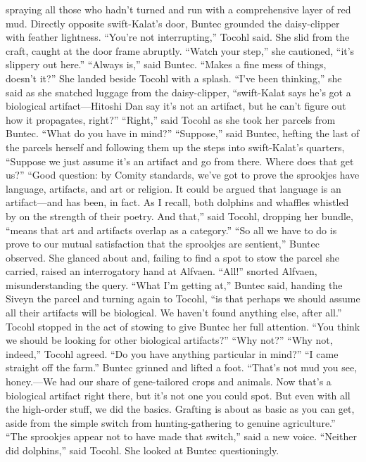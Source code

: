 \documentclass[9pt]{article}
\begin{document}
spraying all those who hadn’t turned and run with a comprehensive layer of red mud. Directly opposite
swift-Kalat’s door, Buntec grounded the daisy-clipper with feather lightness.
“You’re not interrupting,” Tocohl said. She slid from the craft, caught at the door frame abruptly.
“Watch your step,” she cautioned, “it’s slippery out here.”
“Always is,” said Buntec. “Makes a fine mess of things, doesn’t it?” She landed beside Tocohl with
a splash. “I’ve been thinking,” she said as she snatched luggage from the daisy-clipper, “swift-Kalat says
he’s got a biological artifact—Hitoshi Dan say it’s not an artifact, but he can’t figure out how it
propagates, right?”
“Right,” said Tocohl as she took her parcels from Buntec. “What do you have in mind?”
“Suppose,” said Buntec, hefting the last of the parcels herself and following them up the steps into
swift-Kalat’s quarters, “Suppose we just assume it’s an artifact and go from there. Where does that get
us?”
“Good question: by Comity standards, we’ve got to prove the sprookjes have language, artifacts,
and art or religion. It could be argued that language is an artifact—and has been, in fact. As I recall, both
dolphins and whaffles whistled by on the strength of their poetry. And that,” said Tocohl, dropping her
bundle, “means that art and artifacts overlap as a category.”
“So all we have to do is prove to our mutual satisfaction that the sprookjes are sentient,” Buntec
observed. She glanced about and, failing to find a spot to stow the parcel she carried, raised an
interrogatory hand at Alfvaen. “All!” snorted Alfvaen, misunderstanding the query.
“What I’m getting at,” Buntec said, handing the Siveyn the parcel and turning again to Tocohl, “is that
perhaps we should assume all their artifacts will be biological. We haven’t found anything else, after all.”
Tocohl stopped in the act of stowing to give Buntec her full attention. “You think we should be
looking for other biological artifacts?”
“Why not?”
“Why not, indeed,” Tocohl agreed. “Do you have anything particular in mind?”
“I came straight off the farm.” Buntec grinned and lifted a foot. “That’s not mud you see,
honey.—We had our share of gene-tailored crops and animals. Now that’s a biological artifact right
there, but it’s not one you could spot. But even with all the high-order stuff, we did the basics. Grafting is
about as basic as you can get, aside from the simple switch from hunting-gathering to genuine
agriculture.”
“The sprookjes appear not to have made that switch,” said a new voice.
“Neither did dolphins,” said Tocohl. She looked at Buntec questioningly.
\end{document}
